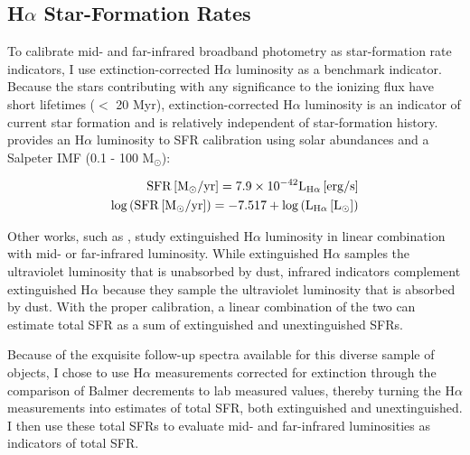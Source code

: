 \subsection{H$\alpha$ Star-Formation Rates}

To calibrate mid- and far-infrared broadband photometry as star-formation rate indicators, I use extinction-corrected H$\alpha$ luminosity as a benchmark indicator. Because the stars contributing with any significance to the ionizing flux have short lifetimes ($<$ 20 Myr), extinction-corrected H$\alpha$ luminosity is an indicator of current star formation and is relatively independent of star-formation history. \cite{Kennicutt} provides an H$\alpha$ luminosity to SFR calibration using solar abundances and a Salpeter IMF (0.1 - 100 M$_\odot$):

\begin{eqnarray}
\rm{SFR}\left[\rm{M}_\odot/yr\right] = 7.9\times10^{-42}\rm{L}_{\rm{H}\alpha}\left[\rm{erg}/\rm{s}\right]\\
\rm{log}\left(\rm{SFR}\left[\rm{M}_\odot/yr\right]\right) = -7.517+\rm{log}\left(\rm{L}_{\rm{H}\alpha}\left[L_\odot\right]\right)
\end{eqnarray}


Other works, such as \cite{Calzetti2007}, study extinguished H$\alpha$ luminosity in linear combination with mid- or far-infrared luminosity. While extinguished H$\alpha$ samples the ultraviolet luminosity that is unabsorbed by dust, infrared indicators complement extinguished H$\alpha$ because they sample the ultraviolet luminosity that is absorbed by dust. With the proper calibration, a linear combination of the two can estimate total SFR as a sum of extinguished and unextinguished SFRs.

Because of the exquisite follow-up spectra available for this diverse sample of objects, I chose to use H$\alpha$ measurements corrected for extinction 
through the comparison of Balmer decrements to lab measured values, thereby turning the H$\alpha$ measurements into estimates of total SFR, both extinguished and unextinguished. I then use these total SFRs to evaluate mid- and far-infrared luminosities as indicators of total SFR.


